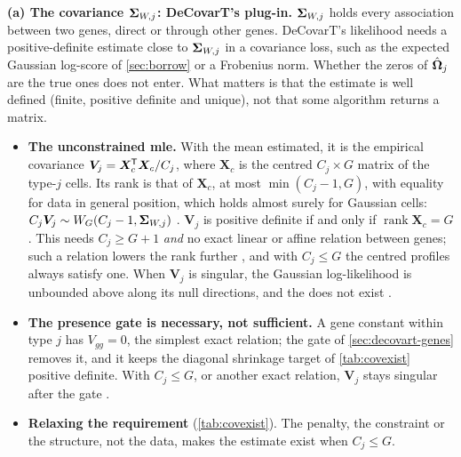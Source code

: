 \documentclass[11pt,a4paper]{article}
\begin{document}
\begin{idbox}[title={Identifiability: covariance versus network}]
\textbf{(a) The covariance $\bm{\Sigma}_{W,j}$: DeCovarT's plug-in.} $\bm{\Sigma}_{W,j}$ holds every association between two genes,
direct or through other genes. DeCovarT's likelihood needs a positive-definite estimate close to $\bm{\Sigma}_{W,j}$
in a covariance loss, such as the expected Gaussian log-score of \cref{sec:borrow} or a Frobenius norm.
Whether the zeros of $\hat{\bm{\Omega}}_j$ are the true ones does not enter. What matters is that the estimate
is well defined (finite, positive definite and unique), not that some algorithm returns a matrix.
\begin{itemize}
  \item \textbf{The unconstrained \gls{mle}.} With the mean estimated, it is the empirical
        covariance $\bm V_j=\bm X_c^{\mkern-1.5mu\mathsf{T}}\bm X_c/C_j$, where $\bm X_c$ is the centred $C_j\times G$ matrix of the
        type-$j$ cells. Its rank is that of $\bm X_c$, at most $\min(C_j-1,G)$, with equality for data in
        general position, which holds almost surely for Gaussian cells: $C_j\bm V_j\sim W_G(C_j-1,\bm{\Sigma}_{W,j})$
        \parencite[ch.~3]{muirheadAspectsMultivariateStatistical1982} . $\bm V_j$ is
        positive definite if and only if $\operatorname{rank}\bm X_c=G$. This needs $C_j\ge G+1$
        \emph{and} no exact linear or affine relation between genes; such a relation lowers the rank
        further , and with $C_j\le G$ the centred profiles always satisfy one. When $\bm V_j$ is
        singular, the Gaussian log-likelihood is unbounded above along its null directions, and the
         does not exist .
  \item \textbf{The presence gate is necessary, not sufficient.} A gene constant within type $j$ has
        $V_{gg}=0$, the simplest exact relation; the gate of \cref{sec:decovart-genes} removes it, and it
        keeps the diagonal shrinkage target of \cref{tab:covexist} positive definite. With $C_j\le G$, or another exact relation,
        $\bm V_j$ stays singular after the gate .
  \item \textbf{Relaxing the requirement} (\cref{tab:covexist}). The penalty, the constraint or the
        structure, not the data, makes the estimate exist when $C_j\le G$.
\end{itemize}
\begin{center}
\footnotesize
\begin{tabularx}{\linewidth}{@{}>{\raggedright\arraybackslash}p{0.17\linewidth}
  >{\raggedright\arraybackslash}X >{\raggedright\arraybackslash}p{0.27\linewidth}@{}}

\end{tabularx}
\end{center}
\end{idbox}
\end{document}
